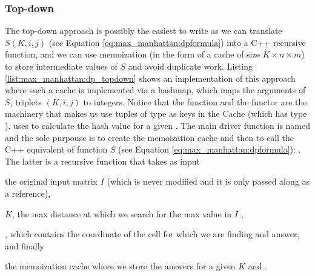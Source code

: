 \subsubsection{Top-down}
The top-down approach is possibly the easiest to write as we can  translate $S(K,i,j)$ (see Equation \ref{eq:max_manhattan:dpformula}) into a C++ recursive function, 
and we can use memoization (in the form of a cache of size $K\times n\times m$) to store intermediate values of $S$ and avoid duplicate work.
Listing \ref{list:max_manhattan:dp_topdown} shows an implementation of this approach where such a cache is implemented via a hashmap, which maps the arguments of $S$, triplets $(K,i,j)$
to integers.
Notice that the function  and the functor  are the machinery that makes us use 
tuples of type  as keys in the Cache (which has type ). 
 uses  to calculate the hash value for a given .
The main driver function is named  and the sole purpouse is to create
the memoization cache and then to call the C++ equivalent of function $S$ (see Equation \ref{eq:max_manhattan:dpformula}): 
. The latter is a recursive function that takes as input
\begin{enumerate*}
	\item the original input matrix $I$ (which is never modified and it is only passed along as a reference),
	\item $K$, the max distance at which we search for the max value in $I$ ,
	\item {}, which contains the coordinate of the cell for which we are finding and answer, and finally
	\item the memoization cache where we store the answers for a given $K$ and .
\end{enumerate*}

